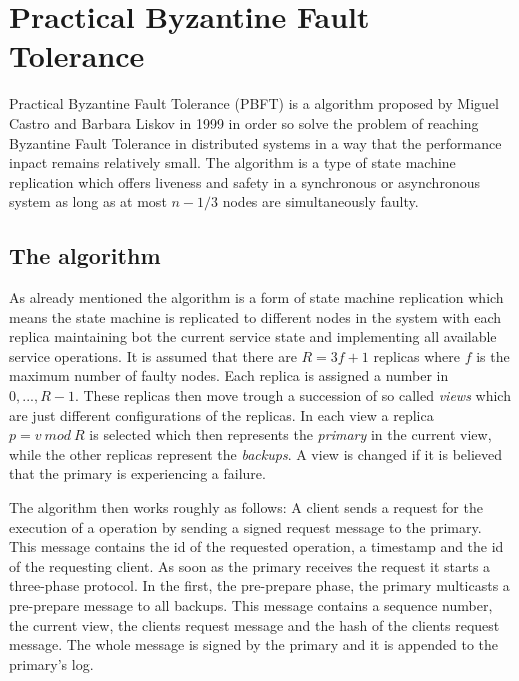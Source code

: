 \section{Practical Byzantine Fault \\
Tolerance}

Practical Byzantine Fault Tolerance (PBFT) is a algorithm proposed by Miguel Castro and Barbara Liskov in 1999 in order so solve the problem of reaching Byzantine Fault Tolerance in distributed
systems in a way that the performance inpact remains relatively small. The algorithm is a type of state machine replication which offers liveness and safety in a synchronous or
asynchronous system as long as at most $n-1/3$ nodes are simultaneously faulty.\cite{url:pbft}

\subsection{The algorithm}

As already mentioned the algorithm is a form of state machine replication which means the state machine is replicated to different nodes in the system with each replica maintaining bot the current
service state and implementing all available service operations. It is assumed that there are $R=3f+1$ replicas where $f$ is the maximum number of faulty nodes. Each replica is assigned a number
in ${0,...,R-1}$. These replicas then move trough a succession of so called \textit{views} which are just different configurations of the replicas. In each view a replica $p=v\ mod\ R$ is selected
which then represents the \textit{primary} in the current view, while the other replicas represent the \textit{backups}. A view is changed if it is believed that the primary is experiencing a
failure.

The algorithm then works roughly as follows: A client sends a request for the execution of a operation by sending a signed request message to the primary. This message contains
the id of the requested operation, a timestamp and the id of the requesting client. As soon as the primary receives the request it starts a three-phase protocol.
In the first, the pre-prepare phase, the primary multicasts a pre-prepare message to all backups. This message contains a sequence number, the current view, the clients request message
and the hash of the clients request message. The whole message is signed by the primary and it is appended to the primary's log.

